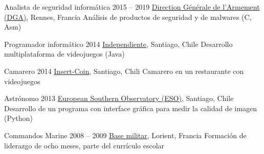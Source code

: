 \begin{joblist}[13.2][7.8][3.5]


\item[Analista de seguridad informática]{2015 -- 2019}
	{
  \href{http://www.defense.gouv.fr/dga/}{Direction Générale de l'Armement (DGA)}, Rennes, Francia
	}
  {Análisis de productos de seguridad y de malwares (C, Asm)}


\item[Programador informático]{2014}
	{
	\href{https://tinmarino.github.io/Page/}{Independiente}, Santiago, Chile
	}
	{Desarrollo multiplataforma de videojuegos (Java)}


\item[Camarero]{2014}
	{
	\href{http://www.insertcoin.cl/}{Insert-Coin}, Santiago, Chili
	}
	{Camarero en un restaurante con videojuegos}


\item[Astrónomo]{2013}
	{
	\href{http://www.eso.org/public/}{European Southern Observatory (ESO)}, Santiago, Chile
	}
  {Desarrollo de un programa con interface gráfica para medir la calidad de imagen (Python)}

	
\item[Commandos Marine]{2008 -- 2009}
	{
	\href{http://www.defense.gouv.fr/marine/organisation/forces/fusiliers-marins-et-commandos/force-maritime-des-fusiliers-marins-et-commandos}{Base militar}, Lorient, Francia
	}
	{Formación de liderazgo de ocho meses, parte del currículo escolar}


	
\end{joblist}


